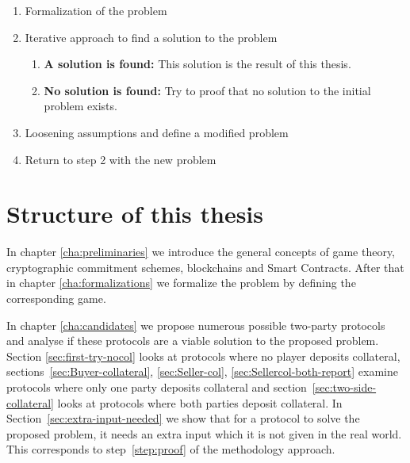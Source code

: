 \documentclass{cacthesis}
\begin{document}
	\begin{enumerate}
	    \item Formalization of the problem \label{step:1}
	    \item Iterative approach to find a solution to the problem \label{step:2}
	            \begin{enumerate}
	            \item \textbf{A solution is found:} This solution is the result of this thesis. \label{step:solution}
	           \item \textbf{No solution is found:} Try to proof that no solution to the initial problem exists. \label{step:proof}
	        \end{enumerate}
	    \item Loosening assumptions and define a modified problem \label{step:modified-problem}
	    \item Return to step 2 with the new problem\label{step:return2}
	\end{enumerate}

	\section{Structure of this thesis}
	In chapter \ref{cha:preliminaries} we introduce the general concepts of game theory, cryptographic commitment schemes, blockchains and Smart Contracts.  After that in chapter \ref{cha:formalizations} we formalize the problem by defining the corresponding game.\newline %
	
	In chapter \ref{cha:candidates} we propose numerous possible two-party protocols and analyse if these protocols are a viable solution to the proposed problem. Section \ref{sec:first-try-nocol} looks at protocols where no player deposits collateral, sections~\ref{sec:Buyer-collateral}, \ref{sec:Seller-col}, \ref{sec:Sellercol-both-report} examine protocols where only one party deposits collateral and section~\ref{sec:two-side-collateral} looks at protocols where both parties deposit collateral. In Section~\ref{sec:extra-input-needed} we show that for a protocol to solve the proposed problem, it needs an extra input which it is not given in the real world. This corresponds to step~\ref{step:proof} of the methodology approach.  \newline
	
\end{document}

